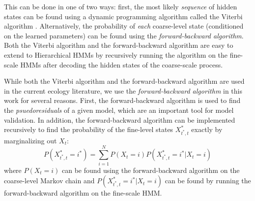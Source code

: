 This can be done in one of two ways: first, the most likely \textit{sequence} of  hidden states can be found using a dynamic programming algorithm called the Viterbi algorithm \cite{Viterbi:1967}. Alternatively, the probability of \textit{each} coarse-level state (conditioned on the learned parameters) can be found using the \textit{forward-backward algorithm}. Both the Viterbi algorithm and the forward-backward algorithm are easy to extend to Hierarchical HMMs by recursively running the algorithm on the fine-scale HMMs after decoding the hidden states of the coarse-scale process.

While both the Viterbi algorithm and the forward-backward algorithm are used in the current ecology literature, we use the \textit{forward-backward algorithm} in this work for several reasons. First, the forward-backward algorithm is used to find the \textit{psuedoresiduals} of a given model, which are an important tool for model validation. In addition, the forward-backward algorithm can be implemented recursively to find the probability of the fine-level states $X^*_{t^*,t}$ exactly by marginalizing out $X_t$:
%
$$P(X^*_{t^*,t} = i^*) = \sum_{i=1}^N P(X_t = i)P(X^*_{t^*,t} = i^* | X_t = i)$$
%
where $P(X_t = i)$ can be found using the forward-backward algorithm on the coarse-level Markov chain and $P(X^*_{t^*,t} = i^* | X_t = i)$ can be found by running the forward-backward algorithm on the fine-scale HMM.